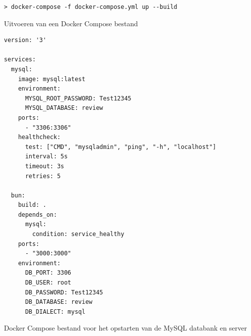 \begin{listing}[H]
  \centering
  \begin{verbatim}
> docker-compose -f docker-compose.yml up --build
      \end{verbatim}
      \caption[Uitvoering Docker Compose]{\label{code:dockercompose}Uitvoeren van een Docker Compose bestand}
\end{listing}
\begin{listing}[H]
  \centering
  \begin{verbatim}
version: '3'

services:
  mysql:
    image: mysql:latest
    environment:
      MYSQL_ROOT_PASSWORD: Test12345
      MYSQL_DATABASE: review
    ports:
      - "3306:3306"
    healthcheck:
      test: ["CMD", "mysqladmin", "ping", "-h", "localhost"]
      interval: 5s
      timeout: 3s
      retries: 5

  bun:
    build: .
    depends_on:
      mysql:
        condition: service_healthy
    ports:
      - "3000:3000"
    environment:
      DB_PORT: 3306
      DB_USER: root
      DB_PASSWORD: Test12345
      DB_DATABASE: review
      DB_DIALECT: mysql
      \end{verbatim}
      \caption[Docker Compose bestand voor MySQL]{\label{code:dockercomposefile}Docker Compose bestand voor het opstarten van de MySQL databank en server}
\end{listing}
